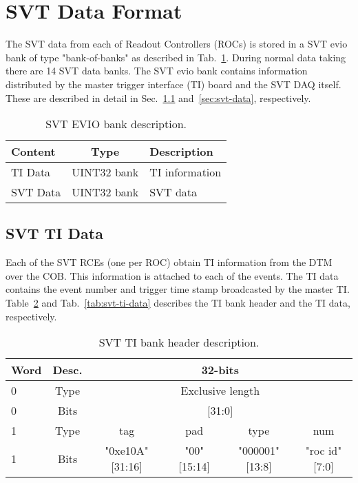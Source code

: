 \documentclass{desyproc}
\begin{document}
\section{SVT Data Format}

The SVT data from each of Readout Controllers (ROCs) is stored in a SVT evio bank of type "bank-of-banks" as 
described in Tab.~\ref{tab:svt-bank}. During normal data taking there are 14 SVT data banks. The SVT evio bank 
contains information distributed by the master trigger interface (TI) board and the SVT DAQ itself. These are described in 
detail in Sec.~\ref{sec:svt-ti-data} and~\ref{sec:svt-data}, respectively.

\begin{table}[]
  \begin{center}
    \caption{SVT EVIO bank description.}
    \label{tab:svt-bank}
    \begin{tabular}{|l|c|l|}
    \hline
    \bf Content & \bf Type & \bf Description\\
      \hline
      TI Data & UINT32 bank & TI information\\
      \hline
      SVT Data & UINT32 bank & SVT data\\
      \hline
      \end{tabular}
  \end{center}
\end{table}


\subsection{SVT TI Data}
\label{sec:svt-ti-data}
Each of the SVT RCEs (one per ROC) obtain TI information from the DTM over the COB. This information is 
attached to each of the events. The TI data contains the event number and trigger time stamp broadcasted by the 
master TI. Table~\ref{tab:svt-ti-header} and Tab.~\ref{tab:svt-ti-data} describes the TI bank header and the TI data, respectively.
\begin{table}[]
  \begin{center}
    \caption{SVT TI bank header description.}
    \label{tab:svt-ti-header}
    \begin{tabular}{|l|c|c|c|c|c|}
   	\hline
    	\bf Word & \bf Desc. & \multicolumn{4}{|c|}{\bf 32-bits}\\
      	\hline
    	 0 &  Type & \multicolumn{4}{|c|}{Exclusive length}\\
	\hline
    	 0 &  Bits & \multicolumn{4}{|c|}{[31:0]}\\
	\hline
    	 1 &  Type & tag & pad & type & num\\
	\hline
    	 1 &  Bits & "0xe10A" [31:16] & "00" [15:14] & "000001" [13:8] &  "roc id" [7:0]\\
	\hline
      \end{tabular}
  \end{center}
\end{table}
\end{document}
